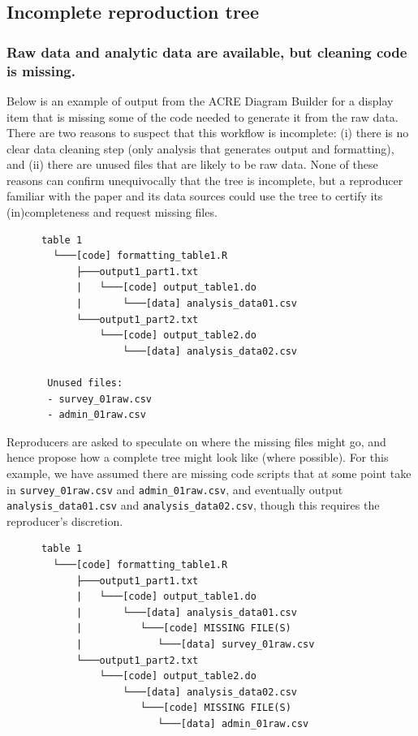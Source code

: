 \documentclass[]{book}
\begin{document}
\hypertarget{incomplete-reproduction-tree}{%
\subsection{Incomplete reproduction tree}\label{incomplete-reproduction-tree}}

\hypertarget{raw-data-and-analytic-data-are-available-but-cleaning-code-is-missing.}{%
\subsubsection{Raw data and analytic data are available, but cleaning code is missing.}\label{raw-data-and-analytic-data-are-available-but-cleaning-code-is-missing.}}

Below is an example of output from the ACRE Diagram Builder for a display item that is missing some of the code needed to generate it from the raw data. There are two reasons to suspect that this workflow is incomplete: (i) there is no clear data cleaning step (only analysis that generates output and formatting), and (ii) there are unused files that are likely to be raw data. None of these reasons can confirm unequivocally that the tree is incomplete, but a reproducer familiar with the paper and its data sources could use the tree to certify its (in)completeness and request missing files.

\begin{verbatim}
      table 1
        └───[code] formatting_table1.R
            ├───output1_part1.txt  
            |   └───[code] output_table1.do           
            |       └───[data] analysis_data01.csv
            └───output1_part2.txt  
                └───[code] output_table2.do           
                    └───[data] analysis_data02.csv

       Unused files: 
       - survey_01raw.csv
       - admin_01raw.csv  
\end{verbatim}

Reproducers are asked to speculate on where the missing files might go, and hence propose how a complete tree might look like (where possible). For this example, we have assumed there are missing code scripts that at some point take in \texttt{survey\_01raw.csv} and \texttt{admin\_01raw.csv}, and eventually output \texttt{analysis\_data01.csv} and \texttt{analysis\_data02.csv}, though this requires the reproducer's discretion.

\begin{verbatim}
      table 1
        └───[code] formatting_table1.R
            ├───output1_part1.txt  
            |   └───[code] output_table1.do           
            |       └───[data] analysis_data01.csv
            |          └───[code] MISSING FILE(S)
            |             └───[data] survey_01raw.csv
            └───output1_part2.txt  
                └───[code] output_table2.do           
                    └───[data] analysis_data02.csv
                       └───[code] MISSING FILE(S)
                          └───[data] admin_01raw.csv  
\end{verbatim}
\end{document}
